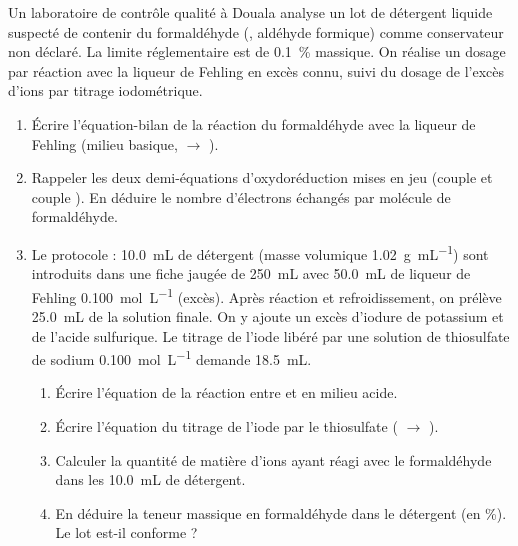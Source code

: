 \documentclass[11pt]{article}
\begin{document}
\begin{exercice}
Un laboratoire de contrôle qualité à Douala analyse un lot de détergent liquide suspecté de contenir du formaldéhyde (, aldéhyde formique) comme conservateur non déclaré. La limite réglementaire est de \SI{0,1}{\%} massique. On réalise un dosage par réaction avec la liqueur de Fehling en excès connu, suivi du dosage de l'excès d'ions  par titrage iodométrique.
\begin{enumerate}
    \item Écrire l'équation-bilan de la réaction du formaldéhyde avec la liqueur de Fehling (milieu basique,  $\to$ ).
    \item Rappeler les deux demi-équations d'oxydoréduction mises en jeu (couple  et couple ). En déduire le nombre d'électrons échangés par molécule de formaldéhyde.
    \item Le protocole : \SI{10,0}{\mL} de détergent (masse volumique \SI{1,02}{g.mL^{-1}}) sont introduits dans une fiche jaugée de \SI{250}{\mL} avec \SI{50,0}{\mL} de liqueur de Fehling \SI{0,100}{mol.L^{-1}} (excès). Après réaction et refroidissement, on prélève \SI{25,0}{\mL} de la solution finale. On y ajoute un excès d'iodure de potassium  et de l'acide sulfurique. Le titrage de l'iode libéré par une solution de thiosulfate de sodium \SI{0,100}{mol.L^{-1}} demande \SI{18,5}{\mL}.
    \begin{enumerate}
        \item Écrire l'équation de la réaction entre  et  en milieu acide.
        \item Écrire l'équation du titrage de l'iode par le thiosulfate ( $\to$ ).
        \item Calculer la quantité de matière d'ions  ayant réagi avec le formaldéhyde dans les \SI{10,0}{\mL} de détergent.
        \item En déduire la teneur massique en formaldéhyde dans le détergent (en \%). Le lot est-il conforme ?
    \end{enumerate}
\end{enumerate}
\end{exercice}
\end{document}

